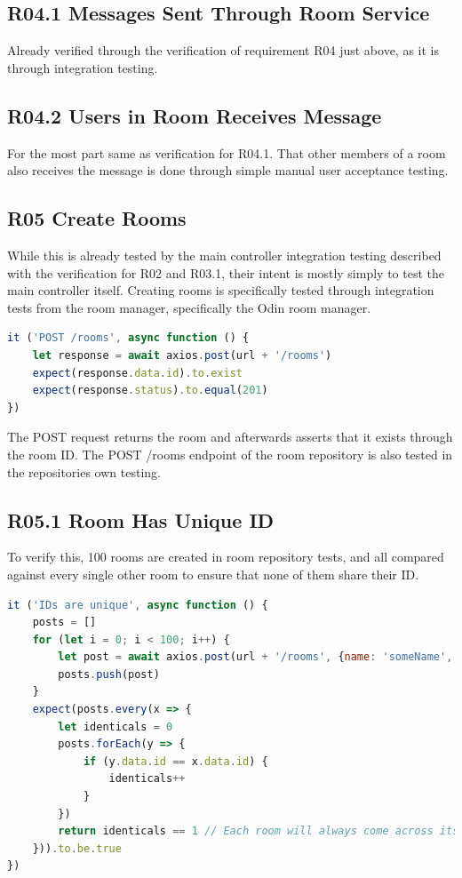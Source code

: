 \subsection{R04.1 Messages Sent Through Room Service}
\label{vR04.1}

Already verified through the verification of requirement R04 just above, as it is through integration testing.

\subsection{R04.2 Users in Room Receives Message}
\label{vR04.2}

For the most part same as verification for R04.1. That other members of a room also receives the message is done through simple manual user acceptance testing.

\subsection{R05 Create Rooms}
\label{vR05}

While this is already tested by the main controller integration testing described with the verification for R02 and R03.1, their intent is mostly simply to test the main controller itself. Creating rooms is specifically tested through integration tests from the room manager, specifically the Odin room manager.

\begin{lstlisting}[language=JavaScript]
it ('POST /rooms', async function () {
    let response = await axios.post(url + '/rooms')
    expect(response.data.id).to.exist
    expect(response.status).to.equal(201)
})
\end{lstlisting}

The POST request returns the room and afterwards asserts that it exists through the room ID. The POST /rooms endpoint of the room repository is also tested in the repositories own testing.

\subsection{R05.1 Room Has Unique ID}
\label{vR05.1}

To verify this, 100 rooms are created in room repository tests, and all compared against every single other room to ensure that none of them share their ID.

\begin{lstlisting}[language=JavaScript]
it ('IDs are unique', async function () {
    posts = []
    for (let i = 0; i < 100; i++) {
        let post = await axios.post(url + '/rooms', {name: 'someName', socketUrl: 'http://someSocketUrl', signallingUrl: 'http://someSignallingUrl'})          
        posts.push(post)      
    }
    expect(posts.every(x => {
        let identicals = 0
        posts.forEach(y => {
            if (y.data.id == x.data.id) {
                identicals++
            }
        })
        return identicals == 1 // Each room will always come across itself.
    })).to.be.true
})
\end{lstlisting}

